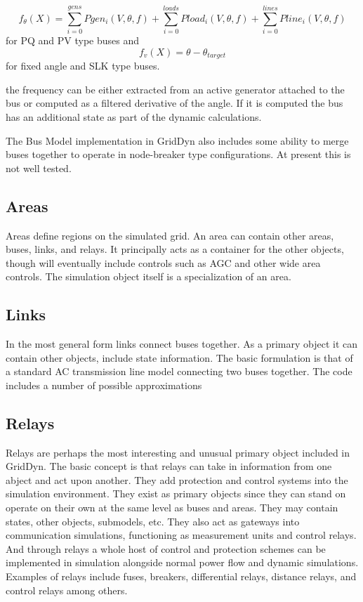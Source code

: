 \documentclass[12pt]{article} %
\begin{document}
\begin{equation}
f_{\theta}(X)=\sum_{i=0}^{gens}Pgen_i(V,\theta,f)+\sum_{i=0}^{loads}Pload_i(V,\theta,f)+\sum_{i=0}^{lines}Pline_i(V,\theta,f)
\end{equation}
for PQ and PV type buses and 
\begin{equation}
f_v(X)=\theta-\theta_{target}
\end{equation}
for fixed angle and SLK type buses.

the frequency can be either extracted from an active generator attached to the bus or computed as a filtered derivative of the angle.  If it is computed the bus has an additional state as part of the dynamic calculations.  

The Bus Model implementation in GridDyn also includes some ability to merge buses together to operate in node-breaker type configurations.  At present this is not well tested.  

\subsection{Areas}
Areas define regions on the simulated grid.  An area can contain other areas, buses, links, and relays.  It principally acts as a container for the other objects, though will eventually include controls such as AGC and other wide area controls. The simulation object itself is a specialization of an area.  

\subsection{Links}
In the most general form links connect buses together.  As a primary object it can contain other objects, include state information.  The basic formulation is that of a standard AC transmission line model connecting two buses together.  The code includes a number of possible approximations 

\subsection{Relays}
Relays are perhaps the most interesting and unusual primary object included in GridDyn.  The basic concept is that relays can take in information from one abject and act upon another.   They add protection and control systems into the simulation environment.  They exist as primary objects since they can stand on operate on their own at the same level as buses and areas.  They may contain states, other objects, submodels, etc.  They also act as gateways into communication simulations, functioning as measurement units and control relays.  And through relays a whole host of control and protection schemes can be implemented in simulation alongside normal power flow and dynamic simulations.  Examples of relays include fuses, breakers, differential relays, distance relays, and control relays among others.  
\end{document}
